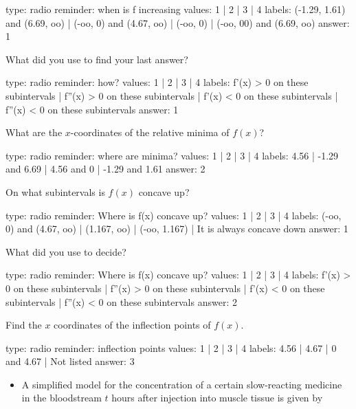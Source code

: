 \documentclass[12pt]{article}
\begin{document}
\begin{answer}
type: radio
reminder: when is f increasing
values: 1 | 2 | 3 | 4
labels: (-1.29, 1.61) and (6.69, oo) | (-oo, 0) and (4.67, oo) | (-oo, 0) | (-oo, 00) and (6.69, oo)
answer: 1
\end{answer}

What did you use to find your last answer?

\begin{answer}
type: radio
reminder: how?
values: 1 | 2 | 3 | 4
labels: f'(x) > 0 on these subintervals | f''(x) > 0 on these subintervals | f'(x) < 0 on these subintervals | f''(x) < 0 on these subintervals
answer: 1
\end{answer}

What are the $x$-coordinates of the relative minima of $f(x)$?

\begin{answer}
type: radio
reminder: where are minima?
values: 1 | 2 | 3 | 4
labels: 4.56 | -1.29 and 6.69 | 4.56 and 0 | -1.29 and 1.61
answer: 2
\end{answer}

On what subintervals is $f(x)$ concave up?

\begin{answer}
type: radio
reminder: Where is f(x) concave up?
values: 1 | 2 | 3 | 4
labels: (-oo, 0) and (4.67, oo) | (1.167, oo) | (-oo, 1.167) | It is always concave down
answer: 1
\end{answer}

What did you use to decide?

\begin{answer}
type: radio
reminder: Where is f(x) concave up?
values: 1 | 2 | 3 | 4
labels: f'(x) > 0 on these subintervals | f''(x) > 0 on these subintervals | f'(x) < 0 on these subintervals | f''(x) < 0 on these subintervals
answer: 2
\end{answer}

Find the $x$ coordinates of the inflection points of $f(x)$.

\begin{answer}
type: radio
reminder: inflection points
values: 1 | 2 | 3 | 4
labels: 4.56 | 4.67 | 0 and 4.67 | Not listed
answer: 3
\end{answer}

\begin{itemize}
\itemsep1pt\parskip0pt
\item
  A simplified model for the concentration of a certain slow-reacting
  medicine in the bloodstream $t$ hours after injection into muscle
  tissue is given by
\end{itemize}
\end{document}
